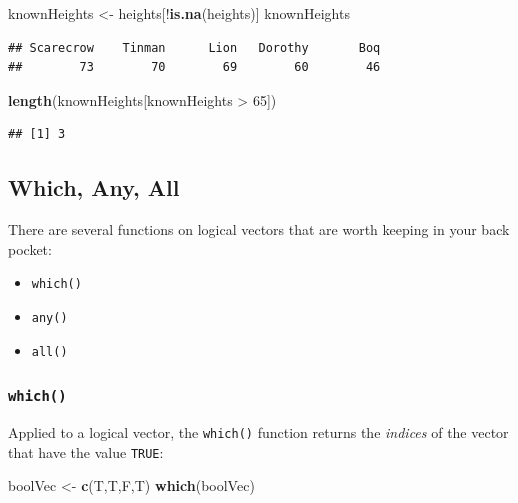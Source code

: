 \documentclass[]{book}
\makeatletter
\newenvironment{Shaded}{\begin{snugshade}}{\end{snugshade}}
\newcommand{\KeywordTok}[1]{\textcolor[rgb]{0.13,0.29,0.53}{\textbf{{#1}}}}
\newcommand{\DecValTok}[1]{\textcolor[rgb]{0.00,0.00,0.81}{{#1}}}
\newcommand{\StringTok}[1]{\textcolor[rgb]{0.31,0.60,0.02}{{#1}}}
\newcommand{\NormalTok}[1]{{#1}}
\providecommand{\tightlist}{%
  \setlength{\itemsep}{0pt}\setlength{\parskip}{0pt}}
\newenvironment{kframe}{%
\medskip{}
\setlength{\fboxsep}{.8em}
 \def\at@end@of@kframe{}%
 \ifinner\ifhmode%
  \def\at@end@of@kframe{\end{minipage}}%
  \begin{minipage}{\columnwidth}%
 \fi\fi%
 \def\FrameCommand##1{\hskip\@totalleftmargin \hskip-\fboxsep
 \colorbox{shadecolor}{##1}\hskip-\fboxsep
     \hskip-\linewidth \hskip-\@totalleftmargin \hskip\columnwidth}%
 \MakeFramed {\advance\hsize-\width
   \@totalleftmargin\z@ \linewidth\hsize
   \@setminipage}}%
 {\par\unskip\endMakeFramed%
 \at@end@of@kframe}
\renewenvironment{Shaded}{\begin{kframe}}{\end{kframe}}
\theoremstyle{definition}
\theoremstyle{definition}
\theoremstyle{remark}
\makeatother
\begin{document}
\begin{Shaded}
\begin{Highlighting}[]
\NormalTok{knownHeights <-}\StringTok{ }\NormalTok{heights[!}\KeywordTok{is.na}\NormalTok{(heights)]}
\NormalTok{knownHeights}
\end{Highlighting}
\end{Shaded}

\begin{verbatim}
## Scarecrow    Tinman      Lion   Dorothy       Boq 
##        73        70        69        60        46
\end{verbatim}

\begin{Shaded}
\begin{Highlighting}[]
\KeywordTok{length}\NormalTok{(knownHeights[knownHeights >}\StringTok{ }\DecValTok{65}\NormalTok{])}
\end{Highlighting}
\end{Shaded}

\begin{verbatim}
## [1] 3
\end{verbatim}

\subsection{Which, Any, All}\label{which-any-all}

There are several functions on logical vectors that are worth keeping in
your back pocket:

\begin{itemize}
\tightlist
\item
  \texttt{which()}
\item
  \texttt{any()}
\item
  \texttt{all()}
\end{itemize}

\subsubsection{\texorpdfstring{\texttt{which()}
}{which() }}\label{which}

Applied to a logical vector, the \texttt{which()} function returns the
\emph{indices} of the vector that have the value \texttt{TRUE}:

\begin{Shaded}
\begin{Highlighting}[]
\NormalTok{boolVec <-}\StringTok{ }\KeywordTok{c}\NormalTok{(T,T,F,T)}
\KeywordTok{which}\NormalTok{(boolVec)}
\end{Highlighting}
\end{Shaded}
\end{document}
